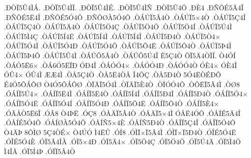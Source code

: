 {.^^d0^^d2^^cf5^^db4^^cc^^c1.
.^^d0^^d2^^cf5^^db4^^cc^^cf.
.^^d0^^d2^^cf5^^db4^^cc^^c9.
.^^d0^^d2^^cf5^^db4^^cc^^d1
.^^d0^^d2^^cf5^^db4^^d4
.^^d0^^c84
.^^d0^^d1^^d4^^c95^^c44^^ce
.^^d0^^d1^^d4^^c95^^cb4^^ce
.^^d0^^d1^^d4^^c95^^d34^^d4
.^^d0^^d1^^d4^^d8^^c05^^d34^^d4
.^^d2^^c1^^da^^cf5^^c24^^d2
.^^d2^^c1^^da^^cf5^^d74^^d2
.^^d2^^c1^^da^^cf5^^c74^^ce
.^^d2^^c1^^da^^cf5^^c74^^d2
.^^d2^^c1^^da^^cf5^^c44^^d2
.^^d2^^c1^^da^^cf5^^d64^^c7
.^^d2^^c1^^da^^cf5^^d64^^d6
.^^d2^^c1^^da^^cf5^^d64^^cd
.^^d2^^c1^^da^^cf5^^da4^^cc
.^^d2^^c1^^da^^cf5^^cc4^^c7
.^^d2^^c1^^da^^cf5^^cd4^^cb
.^^d2^^c1^^da^^cf5^^cd4^^cc
.^^d2^^c1^^da^^cf5^^cd4^^ce
.^^d2^^c1^^da^^cf5^^d04^^d2
.^^d2^^c1^^da^^cf5^^d24^^d7
.^^d2^^c1^^da^^cf5^^d34^^cc
.^^d2^^c1^^da^^cf5^^d34^^d0
.^^d2^^c1^^da^^cf5^^d34^^d4
.^^d2^^c1^^da^^cf5^^d44^^cb
.^^d2^^c1^^da^^cf5^^d44^^d2
.^^d2^^c1^^da^^cf5^^de4^^cc
.^^d2^^c1^^da^^cf5^^de4^^d4
.^^d2^^c1^^da^^cf5^^db4^^cc
.^^d2^^c1^^da^^d55^^c24^^d2
.^^d2^^c1^^da^^d55^^da4^^ce
^^ca5^^c74^^d2
^^d4^^cf5^^c44^^d2^^cf^^cd.
^^d24^^d3^^cd
.^^d2^^c1^^d35^^cb6^^d7
.^^d2^^c16^^d35^^cb^^cf^^d0
^^d3^^d04^^ce
.^^d2^^c1^^d3^^d34^^d7
.^^d2^^c1^^d3^^d34^^d0
.^^d2^^c1^^d3^^d34^^d2
^^d3^^c84^^d7
^^d3^^c84^^ce
^^d3^^db4^^d7
^^d3^^db4^^cc
^^c6^^c64^^cc
.^^d2^^c55^^c74^^d2
.^^d2^^c55^^cb4^^d2^^c5
^^ce4^^d4^^c7
.^^d2^^c55^^d04^^d2
5^^d34^^cb^^d2^^c9^^d0^^d4
^^c94^^d35^^d4^^c1^^d4^^d8
^^d24^^d35^^d4^^c1^^d4^^d8
.^^d2^^cf^^c4^^cf5^^d34^^cc
.^^d2^^cf^^c4^^cf5^^c84^^d2
.^^d2^^cf^^d3^^d34^^d4
.^^d2^^d5^^cb^^cf5^^c24^^cc
.^^d2^^d88
.^^d3^^c1^^cd^^cf5^^da4^^d7
.^^d3^^c1^^cd^^cf5^^cb4^^cc
.^^d3^^c1^^cd^^cf5^^cb4^^d2
.^^d3^^c1^^cd^^cf5^^cd4^^ce
.^^d3^^c1^^cd^^cf5^^d04^^cc
.^^d3^^c1^^cd^^cf5^^d04^^d2
.^^d3^^c1^^cd^^cf5^^d34^^d7
.^^d3^^c1^^cd^^cf5^^d34^^cb
.^^d3^^c1^^cd^^cf5^^d34^^cd
.^^d3^^c1^^cd^^cf5^^d34^^d0
.^^d3^^c1^^cd^^cf5^^d44^^cb
.^^d3^^c1^^cd^^cf5^^d44^^d2
.^^d3^^c1^^cd^^cf5^^c84^^d7
.^^d3^^c2^^c5^^d25^^cb6^^ce
.^^d3^^c28
^^d24^^de^^cb
.^^d3^^c78
.^^d3^^c5^^c4^^cf5^^c24^^d2
.^^d3^^c5^^c4^^cf5^^d74^^cc
^^d3^^c5^^cb4^^d3^^d4
.^^d3^^c5^^cd^^c95^^c44^^ce
.^^d3^^c5^^cd^^c95^^d34^^d4
.^^d3^^c5^^cd^^d8^^c05^^d34^^d4
.^^d3^^c5^^cd^^d15^^d74^^c8
.^^d3^^c5^^cd^^d15^^d04^^d2
.^^d3^^c5^^ce^^cf5^^c74^^ce
.^^d3^^c5^^ce^^cf5^^d34^^d4
^^d24^^c4^^de
8^^d4^^cc^^d8
5^^c74^^d2^^c9^^d7
^^d24^^da^^d3
^^cc4^^cb^^db
.^^d3^^cd8
.^^d3^^cc^^cf^^d7^^cf5^^c24^^cc
.^^d3^^cc^^cf^^d7^^cf5^^d04^^d2
.^^d3^^ce^^c95^^d34^^cb
.^^d3^^ce^^c95^^d34^^c8
.^^d3^^cf5^^c24^^cc^^c0
.^^d3^^cf5^^d74^^d0
.^^d3^^cf5^^c44^^d7
.^^d3^^cf5^^d64^^c7
.^^d3^^cf5^^d64^^d6
.^^d3^^cf5^^da4^^c4
.^^d3^^cf5^^cc4^^d6
^^cc4^^ce^^c3
.^^d3^^cf5^^cd4^^de
.^^d3^^cf^^cf5^^c24^^d2
}

